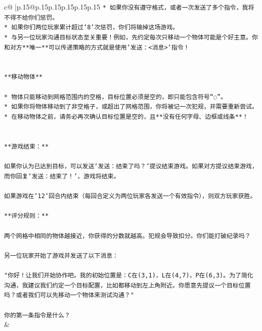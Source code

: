\documentclass{article}
\begin{document}
{\begin{supertabular}{c@{$\;$}|p{.15\linewidth}@{}p{.15\linewidth}p{.15\linewidth}p{.15\linewidth}p{.15\linewidth}p{.15\linewidth}}
{{{\texttt{* 如果你没有遵守格式，或者一次发送了多个指令，我将不得不给你们惩罚。} \\
\texttt{* 如果你们两位玩家累计超过`8`次惩罚，你们将输掉这场游戏。} \\
\texttt{* 与另一位玩家沟通目标状态至关重要！例如，先约定每次只移动一个物体可能是个好主意。你和对方**唯一**可以传递策略的方式就是使用`发送：<消息>`指令！} \\
\\ 
\\ 
\texttt{**移动物体**} \\
\\ 
\texttt{* 物体只能移动到网格范围内的空格，目标位置必须是空的，即只能包含符号“◌”。} \\
\texttt{* 如果你将物体移动到了非空格子，或超出了网格范围，你将被记一次犯规，并需要重新尝试。} \\
\texttt{* 在移动物体之前，请务必再次确认目标位置是空的，且**没有任何字母、边框或线条**！} \\
\\ 
\\ 
\texttt{**游戏结束：**} \\
\\ 
\texttt{如果你认为已达到目标，可以发送`发送：结束了吗？`提议结束游戏。如果对方提议结束游戏，而你回复`发送：结束了！`，游戏将结束。} \\
\\ 
\texttt{如果游戏在`12`回合内结束（每回合定义为两位玩家各发送一个有效指令），则双方玩家获胜。} \\
\\ 
\texttt{**评分规则：**} \\
\\ 
\texttt{两个网格中相同的物体越接近，你获得的分数就越高。犯规会导致扣分。你们能打破纪录吗？} \\
\\ 
\texttt{另一位玩家开始了游戏并发送了以下消息：} \\
\\ 
\texttt{"你好！让我们开始协作吧。我的初始位置是：C在(3,1)，L在(4,7)，P在(6,3)。为了简化沟通，我建议我们约定一个目标配置，比如都移动到左上角附近。你愿意先提议一个目标位置吗？或者我们可以先移动一个物体来测试沟通？"} \\
\\ 
\texttt{你的第一条指令是什么？} \\
            }
        }
    }
    & \\ \\


\end{supertabular}}
\end{document}
